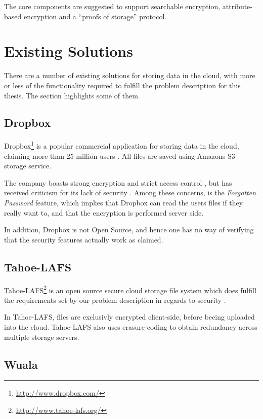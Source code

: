 \documentclass[pdftex,english,10pt,b5paper,twoside]{book}
\begin{document}
The core components are suggested to support searchable encryption,
attribute-based encryption and a ``proofs of storage'' protocol.

\section{Existing Solutions}
There are a number of existing solutions for storing data in the cloud,
with more or less of the functionality required to fulfill the problem
description for this thesis. The section highlights some of them.

\subsection{Dropbox}

Dropbox\footnote{\url{http://www.dropbox.com/}} is a popular commercial
application for storing data in the cloud, claiming more than 25 million users
\cite{dropbox_users}. All files are saved using Amazons S3 storage service.

The company boasts strong encryption and strict access control
\cite{dropbox_security}, but has received criticism for its lack of security
\cite{dropbox_concerns}. Among these concerns, is the \emph{Forgotten Password}
feature, which implies that Dropbox can read the users files if they really want
to, and that the encryption is performed server side.

In addition, Dropbox is not Open Source, and hence one has no way of verifying
that the security features actually work as claimed.

\subsection{Tahoe-LAFS}

Tahoe-\ac{LAFS}\footnote{\url{http://www.tahoe-lafs.org/}} is an open source
secure cloud storage file system which does fulfill the requirements set by our
problem description in regards to security \cite{tahoe}. 

In Tahoe-\ac{LAFS}, files are exclusivly encrypted client-side, before beeing
uploaded into the cloud. Tahoe-\ac{LAFS} also uses erasure-coding to obtain
redundancy across multiple storage servers.

\subsection{Wuala}
\end{document}
